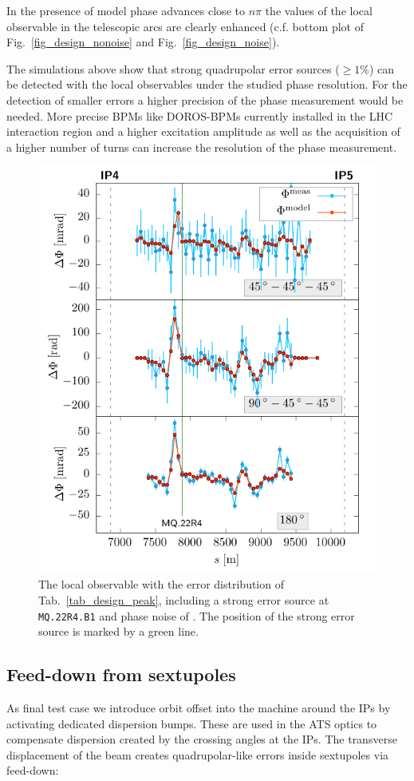 In the presence of model phase advances close to $n\pi$ the values of the local observable in the
telescopic arcs are clearly enhanced (c.f. bottom plot of Fig.~\ref{fig_design_nonoise} and
Fig.~\ref{fig_design_noise}).

The simulations above show that strong quadrupolar error sources ($\geq 1\%$) can be detected with the local
observables under the studied phase resolution.
For the detection of smaller errors a higher precision of the phase measurement would be needed.
More precise BPMs like DOROS-BPMs \cite{Gasior2011} currently installed in the LHC interaction region and a higher excitation
amplitude as well as the acquisition of a higher number of turns
can increase the resolution of the phase measurement. 

\begin{figure}
  \centering
\includegraphics[width=.6\linewidth]{sim_peak}
\caption{The local observable with the error distribution of Tab.~\ref{tab_design_peak}, including
    a strong error source at \texttt{MQ.22R4.B1} and phase
    noise of \noiserms.
    The position of the strong error source is marked by a green line.
  }
  \label{fig_peak_noise}
\end{figure}

\subsection{Feed-down from sextupoles}

As final test case we introduce orbit offset into the machine around the IPs by activating dedicated dispersion
bumps. These are used in the ATS optics to compensate dispersion created by the crossing angles at the IPs.
The transverse displacement of the beam creates quadrupolar-like errors inside sextupoles via feed-down:

